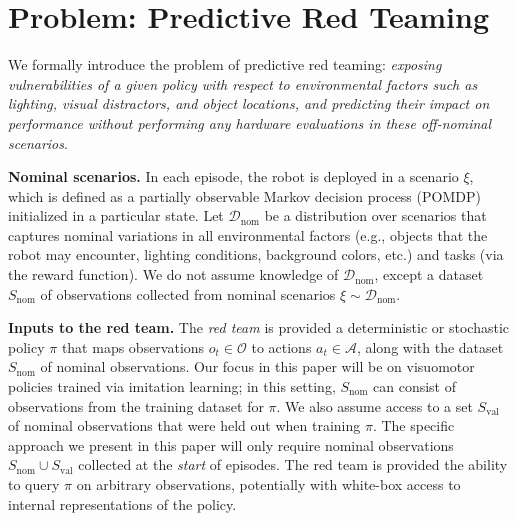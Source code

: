 \section{Problem: Predictive Red Teaming}
\label{sec:problem formulation}


We formally introduce the problem of predictive red teaming: {\it exposing vulnerabilities of a given policy with respect to environmental factors such as lighting, visual distractors, and object locations, and predicting their impact on performance without performing any hardware evaluations in these off-nominal scenarios}.  

{\bf Nominal scenarios.} In each episode, the robot is deployed in a scenario $\xi$, which is defined as a partially observable Markov decision process (POMDP) initialized in a particular state. Let $\mathcal{D}_\text{nom}$ be a distribution over scenarios that captures nominal variations in all environmental factors (e.g., objects that the robot may encounter, lighting conditions, background colors, etc.) and tasks (via the reward function). We do not assume knowledge of $\mathcal{D}_\text{nom}$, except a dataset $S_\text{nom}$ of observations collected from nominal scenarios $\xi \sim \mathcal{D}_\text{nom}$. 

{\bf Inputs to the red team.} The \emph{red team} is provided a deterministic or stochastic policy $\pi$ that maps observations $o_t \in \mathcal{O}$ to actions $a_t \in \mathcal{A}$, along with the dataset $S_\text{nom}$ of nominal observations. Our focus in this paper will be on visuomotor policies trained via imitation learning; in this setting, $S_\text{nom}$ can consist of observations from the training dataset for $\pi$. We also assume access to a set $S_\text{val}$ of nominal observations that were held out when training $\pi$. The specific approach we present in this paper will only require nominal observations $S_\text{nom} \cup S_\text{val}$ collected at the \emph{start} of episodes. 
The red team is provided the ability to query $\pi$ on arbitrary observations, potentially with white-box access to internal representations of the policy. 

